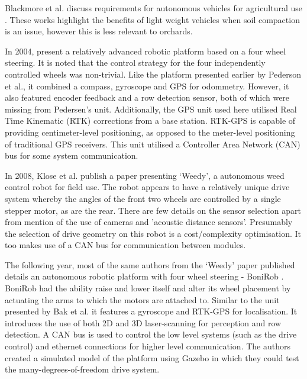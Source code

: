 \documentclass[preprint,authoryear,12pt]{elsarticle}
\begin{document}
    Blackmore et al. discuss requirements for autonomous vehicles for agricultural use \citep{Blackmore2004,Blackmore2007}.
    These works highlight the benefits of light weight vehicles when soil compaction is an issue, however this is less relevant to orchards.
    
    In 2004, \citep{Bak2004} present a relatively advanced robotic platform based on a four wheel steering.
    It is noted that the control strategy for the four independently controlled wheels was non-trivial.
    Like the platform presented earlier by Pederson et al., it combined a compass, gyroscope and GPS for odommetry.
    However, it also featured encoder feedback and a row detection sensor, both of which were missing from Pedersen's unit.
    Additionally, the GPS unit used here utilised Real Time Kinematic (RTK) corrections from a base station.
    RTK-GPS is capable of providing centimeter-level positioning, as opposed to the meter-level positioning of traditional GPS receivers.
    This unit utilised a Controller Area Network (CAN) bus for some system communication.

    In 2008, Klose et al. publish a paper presenting `Weedy', a autonomous weed control robot for field use.
    The robot appears to have a relatively unique drive system whereby the angles of the front two wheels are controlled by a single stepper motor, as are the rear.
    There are few details on the sensor selection apart from mention of the use of cameras and 'acoustic distance sensors'.
    Presumably the selection of drive geometry on this robot is a cost/complexity optimisation.
    It too makes use of a CAN bus for communication between modules.

    The following year, most of the same authors from the `Weedy' paper published details an autonomous robotic platform with four wheel steering - BoniRob \citep{Ruckelshausen2009}.
    BoniRob had the ability raise and lower itself and alter its wheel placement by actuating the arms to which the motors are attached to.
    Similar to the unit presented by Bak et al. it features a gyroscope and RTK-GPS for localisation.
    It introduces the use of both 2D and 3D laser-scanning for perception and row detection.
    A CAN bus is used to control the low level systems (such as the drive control) and ethernet connections for higher level communication.
    The authors created a simulated model of the platform using Gazebo in which they could test the many-degrees-of-freedom drive system.
\end{document}
